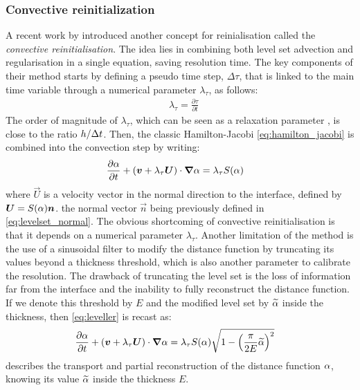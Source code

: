 \subsubsection{Convective reinitialization}
%
A recent work by \citet{ville_convected_2011} introduced another concept for reinialisation 
called the \emph{convective reinitialisation}. The idea lies in combining both level set advection 
and regularisation in a single equation, saving resolution time. The key components of their method
starts by defining a pseudo time step, $\Delta \tau$, that is linked to the main time variable through
a numerical parameter $\lambda_\tau$, as follows:
\begin{align}
\label{eq:pseudotimestep}
& \lambda_\tau = \frac{\partial \tau}{ \partial t}
\end{align}
The order of magnitude of $\lambda_\tau$, which can be seen as a relaxation parameter \citep[see][89]{vigneaux_methodes_2007}, 
is close to the ratio $h/\Delta t$. Then, the classic Hamilton-Jacobi 
\cref{eq:hamilton_jacobi} is combined into the convection step by writing:
\begin{align}
\label{eq:leveller}
& \frac{\partial \alpha}{ \partial t} + \left( \boldsymbol{v} + \lambda_\tau \boldsymbol{U} \right) \cdot \boldsymbol{\nabla} \alpha = \lambda_\tau S(\alpha)
\end{align}
where $\vec{U}$ is a velocity vector in the normal direction to the interface, defined by $\boldsymbol{U}= S(\alpha) \boldsymbol{n}$.
the normal vector $\vec{n}$ being previously defined in \cref{eq:levelset_normal}.
The obvious shortcoming of convective reinitialisation is that it depends on a numerical parameter $\lambda_\tau$.
Another limitation of the method is the use of a sinusoidal filter to modify the distance function by truncating
its values beyond a thickness threshold, which is also another parameter to calibrate the resolution. The drawback
of truncating the level set is the loss of information far from the interface and the inability to fully reconstruct
the distance function.
If we denote this threshold by $E$ and the modified level set by $\widetilde{\alpha}$ inside the thickness, 
then \cref{eq:leveller} is recast as:
\begin{align}
\label{eq:leveller_s}
& \frac{\partial \alpha}{ \partial t} + \left( \boldsymbol{v} + 
\lambda_\tau \boldsymbol{U} \right) \cdot \boldsymbol{\nabla} \alpha = \lambda_\tau S(\alpha)
\sqrt{1-\left( \frac{\pi}{2 E} \widetilde{\alpha} \right)^2}
\end{align}
 describes the transport and partial reconstruction of the distance function $\alpha$,
knowing its value $\widetilde{\alpha}$ inside the thickness $E$. 
%
